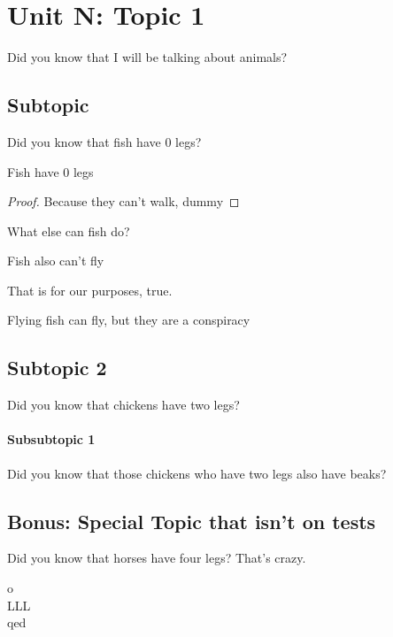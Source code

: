 \chapter{Unit N: Topic 1}
Did you know that I will be talking about animals?
\section{Subtopic}
Did you know that fish have 0 legs?
\begin{theorem}
    Fish have 0 legs
\end{theorem}
\begin{proof}
    Because they can't walk, dummy 
\end{proof}
What else can fish do?
\begin{lemma}
    Fish also can't fly
\end{lemma}
That is for our purposes, true.
\begin{remark}
    Flying fish can fly, but they are a conspiracy
\end{remark}
\section{Subtopic 2}
Did you know that chickens have two legs?
\subsubsection{Subsubtopic 1}
Did you know that those chickens who have two legs also have beaks?
\begin{subappendices}
    \section{Bonus: Special Topic that isn't on tests}
    Did you know that horses have four legs? That's crazy.
    \begin{example}
        o\\
        LLL\\
        qed
    \end{example}
\end{subappendices}
